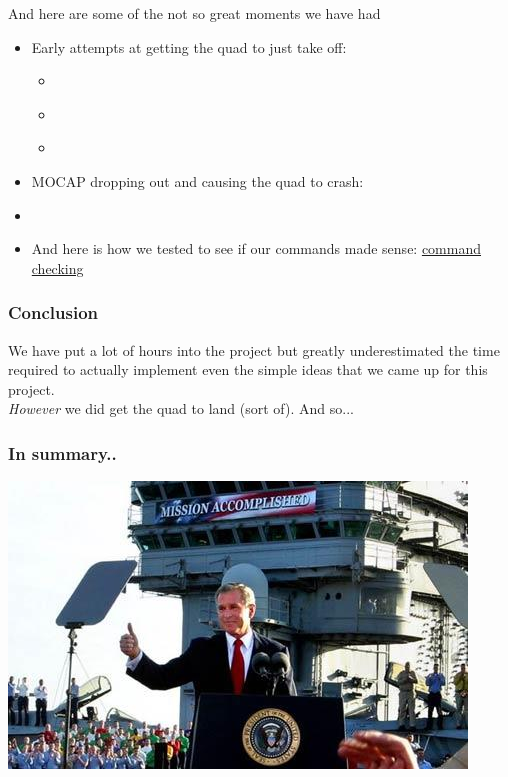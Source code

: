 \documentclass{beamer}
\begin{document}
\begin{frame}
And here are some of the not so great moments we have had
\begin{itemize}
\item Early attempts at getting the quad to just take off: 
	\begin{itemize}
		\item \hyperlink{https://youtu.be/a6_0YQt9BuM?t=29}{} \\
		\item \hyperlink{https://youtu.be/9zpM9thEneg?t=10}{\beamergotobutton{}} \\
		\item \hyperlink{https://youtu.be/5U7R6-7MHrY?t=137}{\beamergotobutton{}}
	\end{itemize}
\item MOCAP dropping out and causing the quad to crash:
		\item \hyperlink{https://youtu.be/ZHCqoEdYbX0?t=30}{}

\item And here is how we tested to see if our commands made sense:
\href{https://youtu.be/0EvrlYkYMyY?t=175}{command checking}

\end{itemize}

\end{frame}

\begin{frame}
\frametitle{Conclusion}
We have put a lot of hours into the project but greatly underestimated the time required to actually implement even the simple ideas that we came up for this project. \\

\textit{However} we did get the quad to land (sort of). And so...
\end{frame}

  \begin{frame}
    \frametitle{In summary..}
    \includegraphics[width=\linewidth]{images/mission_accomplished.jpg}
\end{frame}

\end{document}
